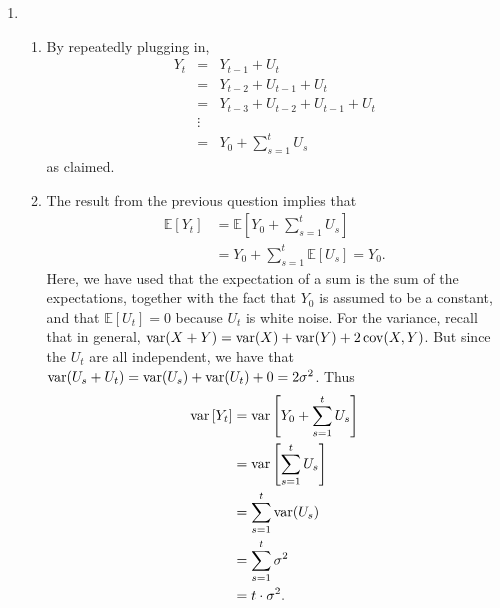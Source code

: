 \documentclass[11pt, a4paper]{article}
\newcommand{\E}{\ensuremath{{\mathbb E}}} %
\def\func#1{\mathop{\rm #1}}
\begin{document}
\begin{enumerate}
\item
\begin{enumerate}
\item By repeatedly plugging in,
\begin{eqnarray*}
Y_t&=&Y_{t-1}+U_t\\
   &=&Y_{t-2}+U_{t-1}+U_t\\
   &=&Y_{t-3}+U_{t-2}+U_{t-1}+U_t\\
&\vdots&\\
&=&Y_0+\sum_{s=1}^t U_s
\end{eqnarray*}
as claimed.
\item The result from the previous question implies that
\begin{align*}
\E\left[Y_t\right]&=\E\left[Y_0+\sum_{s=1}^t U_s\right]\\
&=Y_0+\sum_{s=1}^t \E[U_s]=Y_0.
\end{align*}
Here, we have used that the expectation of a sum is the sum of the expectations, together with the fact that $Y_0$ is assumed to be a constant, and that $\E[U_t]=0$ because $U_t$ is white noise.
For the variance, recall that in general, $\func{var}(X+Y)=\func{var}(X)+\func{var}(Y)+2\func{cov}(X, Y)$. But since the $U_t$ are all independent, we have that $\func{var}(U_s+U_t)=\func{var}(U_s)+\func{var}(U_t)+0=2\sigma^2$. Thus
\begin{align*}
\func{var}\left[Y_t\right]&=\func{var}\left[Y_0+\sum_{s=1}^t U_s\right]\\
&=\func{var}\left[\sum_{s=1}^t U_s\right]\\
&=\sum_{s=1}^t \func{var}(U_s)\\
&=\sum_{s=1}^t \sigma^2\\
&=t\cdot\sigma^2.
\end{align*}

\end{enumerate}

\end{enumerate}
\end{document}
